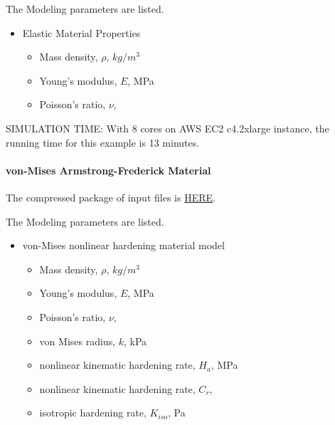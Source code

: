 The Modeling parameters are listed.
\begin{itemize}
  \item Elastic Material Properties 
  \begin{itemize}
    \item Mass density, $\rho$, \enspace {} $kg/m^3$
    \item Young's modulus, $E$, \enspace {} MPa
    \item Poisson's ratio, $\nu$, \enspace {}
  \end{itemize}
\end{itemize}

SIMULATION TIME: With 8 cores on AWS EC2 c4.2xlarge instance, the running time for this example is 13 minutes.

\paragraph{von-Mises Armstrong-Frederick Material}
The compressed package of input files is  
\href{https://github.com/yuan-energy/Real-ESSI-Short-Course-Examples/tree/master/short-course-examples/nonlinear_analysis_steps/soil-foundation/vonMisesArmstrongFrederick/vonMisesArmstrongFrederick.tgz?raw=true}{HERE}. 


The Modeling parameters are listed.
\begin{itemize}
  \item von-Mises nonlinear hardening material model 
  \begin{itemize}
    \item Mass density, $\rho$, \enspace {} $kg/m^3$
    \item Young's modulus, $E$, \enspace {} MPa
    \item Poisson's ratio, $\nu$, \enspace {}
    \item von Mises radius, $k$, \enspace {} kPa
    \item nonlinear kinematic hardening rate, $H_a$, \enspace {} MPa
    \item nonlinear kinematic hardening rate, $C_r$, \enspace {}
    \item isotropic hardening rate, $K_{iso}$, \enspace {} Pa
  \end{itemize}
\end{itemize}


